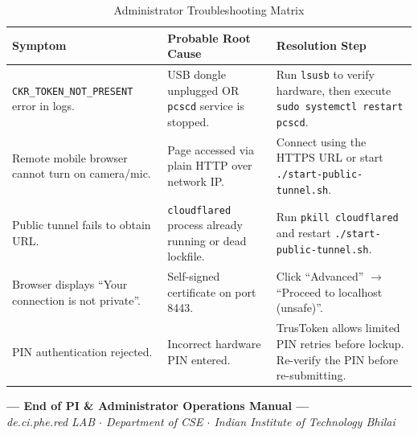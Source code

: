 \documentclass[11pt,a4paper]{report}
\begin{document}
\begin{table}[h!]
\centering
\small
\begin{tabularx}{\textwidth}{p{4cm}Xp{4.5cm}}
\toprule
\textbf{Symptom} & \textbf{Probable Root Cause} & \textbf{Resolution Step} \\
\midrule
\texttt{CKR\_TOKEN\_NOT\_PRESENT} error in logs. & USB dongle unplugged OR \texttt{pcscd} service is stopped. & Run \texttt{lsusb} to verify hardware, then execute \texttt{sudo systemctl restart pcscd}. \\
\midrule
Remote mobile browser cannot turn on camera/mic. & Page accessed via plain HTTP over network IP. & Connect using the HTTPS URL or start \texttt{./start-public-tunnel.sh}. \\
\midrule
Public tunnel fails to obtain URL. & \texttt{cloudflared} process already running or dead lockfile. & Run \texttt{pkill cloudflared} and restart \texttt{./start-public-tunnel.sh}. \\
\midrule
Browser displays ``Your connection is not private''. & Self-signed certificate on port 8443. & Click ``Advanced'' $\rightarrow$ ``Proceed to localhost (unsafe)''. \\
\midrule
PIN authentication rejected. & Incorrect hardware PIN entered. & TrusToken allows limited PIN retries before lockup. Re-verify the PIN before re-submitting. \\
\bottomrule
\end{tabularx}
\caption{Administrator Troubleshooting Matrix}
\end{table}

\vspace{2cm}
\begin{center}
\textbf{--- End of PI \& Administrator Operations Manual ---}\\
\small \textit{de.ci.phe.red LAB $\cdot$ Department of CSE $\cdot$ Indian Institute of Technology Bhilai}
\end{center}
\end{document}
